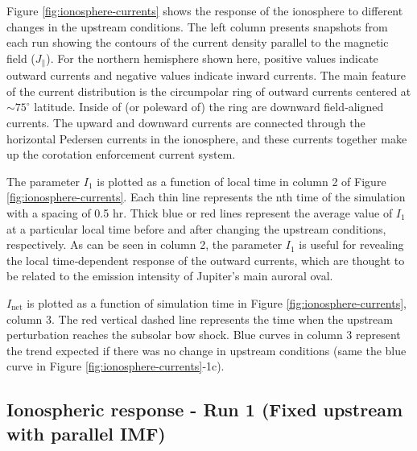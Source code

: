 Figure \ref{fig:ionosphere-currents} shows the response of the ionosphere to different changes in the upstream conditions. The left column presents snapshots from each run showing the contours of the current density parallel to the magnetic field ($J_\parallel$). For the northern hemisphere shown here, positive values indicate outward currents and negative values indicate inward currents. The main feature of the current distribution is the circumpolar ring of outward currents centered at $\sim75^\circ$ latitude. Inside of (or poleward of) the ring are downward field‐aligned currents. The upward and downward currents are connected through the horizontal Pedersen currents in the ionosphere, and these currents together make up the corotation enforcement current system. 

The parameter $I_1$ is plotted as a function of local time in column 2 of Figure \ref{fig:ionosphere-currents}. Each thin line represents the nth time of the simulation with a spacing of 0.5 hr. Thick blue or red lines represent the average value of $I_1$ at a particular local time before and after changing the upstream conditions, respectively. As can be seen in column 2, the parameter $I_1$ is useful for revealing the local time‐dependent response of the outward currents, which are thought to be related to the emission intensity of Jupiter's main auroral oval. 

$I_\text{net}$ is plotted as a function of simulation time in Figure \ref{fig:ionosphere-currents}, column 3. The red vertical dashed line represents the time when the upstream perturbation reaches the subsolar bow shock. Blue curves in column 3 represent the trend expected if there was no change in upstream conditions (same the blue curve in Figure \ref{fig:ionosphere-currents}‐1c).

\subsection{Ionospheric response - Run 1 (Fixed upstream with parallel IMF)}

